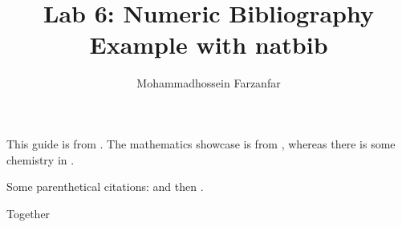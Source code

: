 \documentclass{article}
\author{Mohammadhossein Farzanfar}
\title{Lab 6: Numeric Bibliography Example with natbib}
\begin{document}
\maketitle
This guide is from \citet{Kulyabov2023}. The mathematics showcase is from \citet{Graham1995}, whereas there is some chemistry in \citet{Thomas2008}.

Some parenthetical citations: \citep{Kulyabov2023} and then \citep[p.~56]{Thomas2008}.

\citep[See][pp.~45--48]{Graham1995}

Together \citep{Kulyabov2023,Graham1995,Thomas2008}



\end{document}
